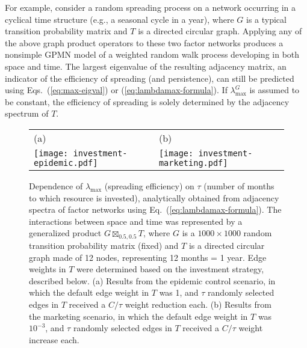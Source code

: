 \documentclass{article}
\DeclareMathOperator*{\GP}{\boxtimes}
\begin{document}
For example, consider a random spreading process on a network
occurring in a cyclical time structure (e.g., a seasonal cycle in a
year), where $G$ is a typical transition probability matrix and $T$ is
a directed circular graph. Applying any of the above graph product
operators to these two factor networks produces a nonsimple GPMN model
of a weighted random walk process developing in both space and
time. The largest eigenvalue of the resulting adjacency matrix, an
indicator of the efficiency of spreading (and persistence), can still
be predicted using Eqs.~(\ref{eq:max-eigval}) or
(\ref{eq:lambdamax-formula}). If $\lambda^G_{\max}$ is assumed to be
constant, the efficiency of spreading is solely determined by the
adjacency spectrum of $T$.

\begin{figure}
\centering
\begin{tabular}{ll}
(a) & (b)\\
\texttt{[image: investment-epidemic.pdf]} &
\texttt{[image: investment-marketing.pdf]}
\end{tabular}
\caption{Dependence of $\lambda_{\max}$ (spreading efficiency) on
  $\tau$ (number of months to which resource is invested),
  analytically obtained from adjacency spectra of factor networks
  using Eq.~(\ref{eq:lambdamax-formula}). The interactions between
  space and time was represented by a generalized product $G
  \GP_{0.5,0.5} T$, where $G$ is a $1000 \times 1000$ random
  transition probability matrix (fixed) and $T$ is a directed circular
  graph made of 12 nodes, representing 12 months = 1 year. Edge
  weights in $T$ were determined based on the investment strategy,
  described below. (a) Results from the epidemic control scenario, in
  which the default edge weight in $T$ was 1, and $\tau$ randomly
  selected edges in $T$ received a $C/\tau$ weight reduction each. (b)
  Results from the marketing scenario, in which the default edge
  weight in $T$ was $10^{-3}$, and $\tau$ randomly selected edges in
  $T$ received a $C/\tau$ weight increase each.}
\label{fig:epidemic-marketing}
\end{figure}
\end{document}
